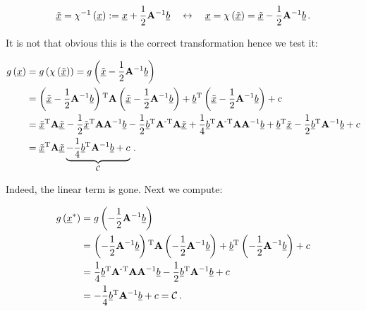 \documentclass[a4paper,10pt]{article}
\begin{document}
\begin{equation}
 \underline{\tilde{x}} = \chi^{-1}\left(\underline{x}\right) := \underline{x} + \frac{1}{2}\mathbf{A}{}^{-1}\underline{b}
 \quad \leftrightarrow \quad
 \underline{x} = \chi\left(\underline{\tilde{x}}\right) = \underline{\tilde{x}} - \frac{1}{2}\mathbf{A}{}^{-1}\underline{b} \,.
\end{equation}

It is not that obvious this is the correct transformation hence we test it:

\begin{equation}
\begin{split}
 g\left(\underline{x}\right) & = g\left(\chi\left(\underline{\tilde{x}}\right)\right)
                         = g\left(\underline{\tilde{x}} - \frac{1}{2}\mathbf{A}{}^{-1}\underline{b}\right) \\
 & = \left(\underline{\tilde{x}} - \frac{1}{2}\mathbf{A}{}^{-1}\underline{b}\right){}^{\textnormal{T}}
     \mathbf{A}
     \left(\underline{\tilde{x}} - \frac{1}{2}\mathbf{A}{}^{-1}\underline{b}\right)
     + \underline{b}{}^{\textnormal{T}} \left(\underline{\tilde{x}} - \frac{1}{2}\mathbf{A}{}^{-1}\underline{b}\right)
     + c \\
 & = \underline{\tilde{x}}{}^{\textnormal{T}} \mathbf{A} \underline{\tilde{x}}
   - \frac{1}{2} \underline{\tilde{x}}{}^{\textnormal{T}} \mathbf{A} \mathbf{A}{}^{-1} \underline{b}
   - \frac{1}{2} \underline{b}{}^{\textnormal{T}} \mathbf{A}{}^{\textnormal{-T}} \mathbf{A} \underline{\tilde{x}}
   + \frac{1}{4} \underline{b}{}^{\textnormal{T}} \mathbf{A}{}^{\textnormal{-T}} \mathbf{A} \mathbf{A}{}^{-1} \underline{b}
   + \underline{b}{}^{\textnormal{T}} \underline{\tilde{x}}
   - \frac{1}{2} \underline{b}{}^{\textnormal{T}} \mathbf{A}{}^{-1} \underline{b}
   + c \\
 & = \underline{\tilde{x}}{}^{\textnormal{T}} \mathbf{A} \underline{\tilde{x}}
     \underbrace{- \frac{1}{4} \underline{b}{}^{\textnormal{T}} \mathbf{A}{}^{-1} \underline{b} + c}_{\mathcal{C}} \,.
\end{split}
\end{equation}

Indeed, the linear term is gone. Next we compute:

\begin{equation}
\begin{split}
 g\left(\underline{x}^{*}\right) & = g\left(-\frac{1}{2}\mathbf{A}{}^{-1}\underline{b}\right) \\
 & = \left(-\frac{1}{2}\mathbf{A}{}^{-1} \underline{b}\right){}^{\textnormal{T}}
     \mathbf{A}
     \left(-\frac{1}{2}\mathbf{A}{}^{-1} \underline{b}\right)
     + \underline{b}{}^{\textnormal{T}} \left(-\frac{1}{2}\mathbf{A}{}^{-1} \underline{b}\right)
     + c \\
 & = \frac{1}{4} \underline{b}{}^{\textnormal{T}} \mathbf{A}{}^{\textnormal{-T}}\mathbf{A}\mathbf{A}{}^{-1} \underline{b}
     - \frac{1}{2} \underline{b}{}^{\textnormal{T}} \mathbf{A}{}^{-1} \underline{b}
     + c \\
 & = -\frac{1}{4} \underline{b}{}^{\textnormal{T}} \mathbf{A}{}^{-1} \underline{b} + c = \mathcal{C} \,.
\end{split}
\end{equation}
\end{document}
